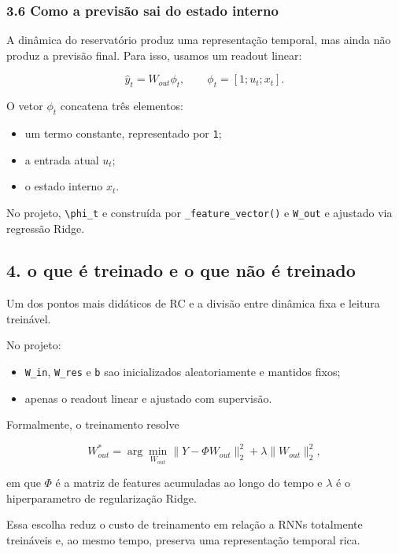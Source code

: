 \documentclass[12pt]{article}
\providecommand{\tightlist}{%
          \setlength{\itemsep}{0pt}\setlength{\parskip}{0pt}}
\begin{document}
\subsubsection{3.6 Como a previsão sai do estado interno}\label{36-como-a-previsuxe3o-sai-do-estado-interno}

A dinâmica do reservatório produz uma representação temporal, mas ainda não produz a previsão final. Para isso, usamos um readout linear:

\[
\hat{y}_t = W_{out} \phi_t,
\qquad
\phi_t = [1; u_t; x_t].
\]

O vetor \(\phi_t\) concatena três elementos:

\begin{itemize}
\tightlist
\item
  um termo constante, representado por \texttt{1};
\item
  a entrada atual \(u_t\);
\item
  o estado interno \(x_t\).
\end{itemize}

No projeto, \texttt{\textbackslash{}phi\_t} e construída por \texttt{\_feature\_vector()} e \texttt{W\_out} e ajustado via regressão Ridge.

\subsection{4. o que é treinado e o que não é treinado}\label{4-o-que-uxe9-treinado-e-o-que-nuxe3o-uxe9-treinado}

Um dos pontos mais didáticos de RC e a divisão entre dinâmica fixa e leitura treinável.

No projeto:

\begin{itemize}
\tightlist
\item
  \texttt{W\_in}, \texttt{W\_res} e \texttt{b} sao inicializados aleatoriamente e mantidos fixos;
\item
  apenas o readout linear e ajustado com supervisão.
\end{itemize}

Formalmente, o treinamento resolve

\[
W_{out}^* = \arg\min_{W_{out}}
\|Y - \Phi W_{out}\|_2^2 + \lambda \|W_{out}\|_2^2,
\]

em que \(\Phi\) é a matriz de features acumuladas ao longo do tempo e \(\lambda\) é o hiperparametro de regularização Ridge.

Essa escolha reduz o custo de treinamento em relação a RNNs totalmente treináveis e, ao mesmo tempo, preserva uma representação temporal rica.
\end{document}
